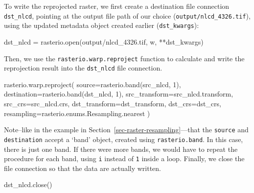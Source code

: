 \documentclass[
  letterpaper,
]{krantz}
\newenvironment{Shaded}{\begin{snugshade}}{\end{snugshade}}
\newcommand{\BuiltInTok}[1]{\textcolor[rgb]{0.00,0.23,0.31}{#1}}
\newcommand{\DecValTok}[1]{\textcolor[rgb]{0.68,0.00,0.00}{#1}}
\newcommand{\NormalTok}[1]{\textcolor[rgb]{0.00,0.23,0.31}{#1}}
\newcommand{\OperatorTok}[1]{\textcolor[rgb]{0.37,0.37,0.37}{#1}}
\newcommand{\StringTok}[1]{\textcolor[rgb]{0.13,0.47,0.30}{#1}}
\begin{document}
To write the reprojected raster, we first create a destination file
connection \texttt{dst\_nlcd}, pointing at the output file path of our
choice
(\texttt{\textquotesingle{}output/nlcd\_4326.tif\textquotesingle{}}),
using the updated metadata object created earlier
(\texttt{dst\_kwargs}):

\begin{Shaded}
\begin{Highlighting}[]
\NormalTok{dst\_nlcd }\OperatorTok{=}\NormalTok{ rasterio.}\BuiltInTok{open}\NormalTok{(}\StringTok{\textquotesingle{}output/nlcd\_4326.tif\textquotesingle{}}\NormalTok{, }\StringTok{\textquotesingle{}w\textquotesingle{}}\NormalTok{, }\OperatorTok{**}\NormalTok{dst\_kwargs)}
\end{Highlighting}
\end{Shaded}

Then, we use the \texttt{rasterio.warp.reproject} function to calculate
and write the reprojection result into the \texttt{dst\_nlcd} file
connection.

\begin{Shaded}
\begin{Highlighting}[]
\NormalTok{rasterio.warp.reproject(}
\NormalTok{    source}\OperatorTok{=}\NormalTok{rasterio.band(src\_nlcd, }\DecValTok{1}\NormalTok{),}
\NormalTok{    destination}\OperatorTok{=}\NormalTok{rasterio.band(dst\_nlcd, }\DecValTok{1}\NormalTok{),}
\NormalTok{    src\_transform}\OperatorTok{=}\NormalTok{src\_nlcd.transform,}
\NormalTok{    src\_crs}\OperatorTok{=}\NormalTok{src\_nlcd.crs,}
\NormalTok{    dst\_transform}\OperatorTok{=}\NormalTok{dst\_transform,}
\NormalTok{    dst\_crs}\OperatorTok{=}\NormalTok{dst\_crs,}
\NormalTok{    resampling}\OperatorTok{=}\NormalTok{rasterio.enums.Resampling.nearest}
\NormalTok{)}
\end{Highlighting}
\end{Shaded}

Note--like in the example in Section~\ref{sec-raster-resampling}---that
the \texttt{source} and \texttt{destination} accept a `band' object,
created using \texttt{rasterio.band}. In this case, there is just one
band. If there were more bands, we would have to repeat the procedure
for each band, using \texttt{i} instead of \texttt{1} inside a loop.
Finally, we close the file connection so that the data are actually
written.

\begin{Shaded}
\begin{Highlighting}[]
\NormalTok{dst\_nlcd.close()}
\end{Highlighting}
\end{Shaded}
\end{document}
